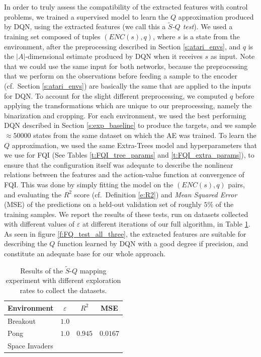 In order to truly assess the compatibility of the extracted features 
with control problems, we trained a supervised model to learn the $Q$ 
approximation produced by DQN, using the extracted features (we call this 
a \textit{$\tilde{S}$-$Q$ test}). 
We used a training set composed of tuples $(ENC(s), q)$, where $s$ is a 
state from the environment, after the preprocessing described in Section 
\ref{s:atari_envs}, and $q$ is the $|A|$-dimensional estimate produced by DQN 
when it receives $s$ as input. Note that we could use the same input
for both networks, because the preprocessing that we perform on the observations 
before feeding a sample to the encoder (cf.\ Section \ref{s:atari_envs}) 
are basically the same that are applied to the inputs for DQN. To account for 
the slight different preprocessing, we computed $q$ before applying the 
transformations which are unique to our preprocessing, namely the binarization 
and cropping. 
For each environment, we used the best performing DQN described in Section 
\ref{s:exp_baseline} to produce the targets, and we sample $\approx50000$ states
from the same dataset on which the AE was trained.
To learn the $Q$ approximation, we used the same Extra-Trees model and 
hyperparameters that we use for FQI (See Tables \ref{t:FQI_tree_params} and
\ref{t:FQI_extra_params}), to ensure that the configuration itself was 
adequate to describe the nonlinear relations between the features and the 
action-value function at convergence of FQI. 
This was done by simply fitting the model on the $(ENC(s), q)$ pairs, and 
evaluating the $R^2$ score (cf.\ Definition \eqref{e:R2}) and \textit{Mean 
Squared Error} (MSE) of the predictions on a held-out validation set of roughly 
$5\%$ of the training samples.
We report the results of these tests, run on datasets collected with different
values of $\varepsilon$ at different iterations of our full algorithm, in 
Table \ref{t:FQ_tests}.
As seen in figure \ref{f:FQ_test_all_three}, the extracted features are suitable
for describing the $Q$ function learned by DQN with a good degree if precision, 
and constitute an adequate base for our whole approach. 
%
\begin{table}
    \centering
    \begin{tabular}{l c c c} 
	\hline
	Environment    & $\varepsilon$ & $R^2$   & MSE \\ 
	\hline 
	Breakout       & $1.0$         & $ $     & $ $ \\
	Pong 	       & $1.0$         & $0.945$ & $0.0167$ \\
	Space Invaders & $ $           & $ $     & $ $ \\
	\hline
    \end{tabular}
    \caption[Results of $\tilde{S}$-$Q$ mapping experiment]{Results of the 
	     $\tilde{S}$-$Q$ mapping experiment with different exploration rates
	     to collect the datasets.}
    \label{t:FQ_tests}
\end{table}
